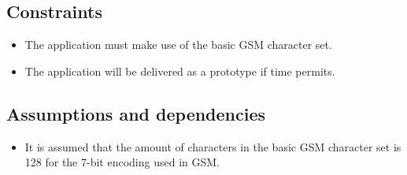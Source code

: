 \subsection{Constraints}
\begin{itemize}
\item The application must make use of the basic GSM character set.
\item The application will be delivered as a prototype if time permits.
\end{itemize}



\subsection{Assumptions and dependencies}

\begin{itemize}
\item It is assumed that the amount of characters in the basic GSM character set is 128 for the 7-bit encoding used in GSM.
\end{itemize}
